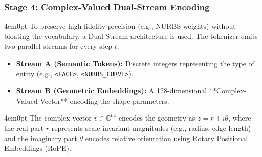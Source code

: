 	\subsubsection{Stage 4: Complex-Valued Dual-Stream Encoding}
		\begin{indentedblock}{4em}{0pt}
			To preserve high-fidelity precision (e.g., NURBS weights) without bloating the vocabulary, a Dual-Stream architecture is used. The tokenizer emits two parallel streams for every step $t$:
			\begin{itemize}
				\item \textbf{Stream A (Semantic Tokens):} Discrete integers representing the type of entity (e.g., \texttt{<FACE>}, \texttt{<NURBS\_CURVE>}).
				\item \textbf{Stream B (Geometric Embeddings):} A 128-dimensional **Complex-Valued Vector** encoding the shape parameters.
			\end{itemize}
		\end{indentedblock}
	
	\begin{indentedblock}{4em}{0pt}
		The complex vector $v \in \mathbb{C}^{64}$ encodes the geometry as $z = r + i\theta$, where the real part $r$ represents scale-invariant magnitudes (e.g., radius, edge length) and the imaginary part $\theta$ encodes relative orientation using Rotary Positional Embeddings (RoPE).
	\end{indentedblock}


